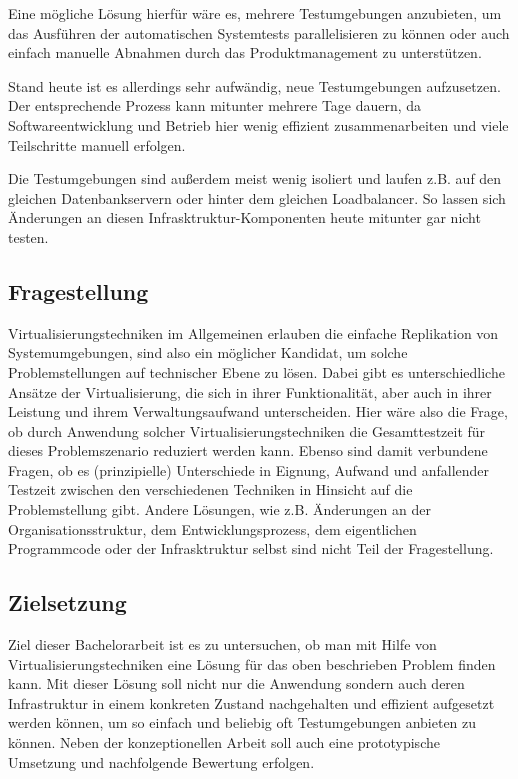 Eine mögliche Lösung hierfür wäre es, mehrere Testumgebungen anzubieten, um das Ausführen der automatischen Systemtests parallelisieren zu können oder auch einfach manuelle Abnahmen durch das Produktmanagement zu unterstützen.

Stand heute ist es allerdings sehr aufwändig, neue Testumgebungen aufzusetzen. Der entsprechende Prozess kann mitunter mehrere Tage dauern, da Softwareentwicklung und Betrieb hier wenig effizient zusammenarbeiten und viele Teilschritte manuell erfolgen.

Die Testumgebungen sind außerdem meist wenig isoliert und laufen z.B. auf den gleichen Datenbankservern oder hinter dem gleichen Loadbalancer. So lassen sich Änderungen an diesen Infrasktruktur-Komponenten heute mitunter gar nicht testen.

\subsection{Fragestellung}

Virtualisierungstechniken im Allgemeinen erlauben die einfache Replikation von Systemumgebungen, sind also ein möglicher Kandidat, um solche Problemstellungen auf technischer Ebene zu lösen. Dabei gibt es unterschiedliche Ansätze der Virtualisierung, die sich in ihrer Funktionalität, aber auch in ihrer Leistung und ihrem Verwaltungsaufwand unterscheiden. Hier wäre also die Frage, ob durch Anwendung solcher Virtualisierungstechniken die Gesamttestzeit für dieses Problemszenario reduziert werden kann. Ebenso sind damit verbundene Fragen, ob es (prinzipielle) Unterschiede in Eignung, Aufwand und anfallender Testzeit zwischen den verschiedenen Techniken in Hinsicht auf die Problemstellung gibt. Andere Lösungen, wie z.B. Änderungen an der Organisationsstruktur, dem Entwicklungsprozess, dem eigentlichen Programmcode oder der Infrasktruktur selbst sind nicht Teil der Fragestellung.

\subsection{Zielsetzung}

Ziel dieser Bachelorarbeit ist es zu untersuchen, ob man mit Hilfe von Virtualisierungstechniken eine Lösung für das oben beschrieben Problem finden kann. Mit dieser Lösung soll nicht nur die Anwendung sondern auch deren Infrastruktur in einem konkreten Zustand nachgehalten und effizient aufgesetzt werden können, um so einfach und beliebig oft Testumgebungen anbieten zu können. Neben der konzeptionellen Arbeit soll auch eine prototypische Umsetzung und nachfolgende Bewertung erfolgen.

